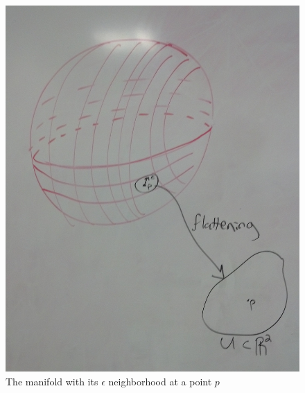 \begin{figure}[ht]
\centering
\includegraphics[width=\columnwidth]{manifolddiagram.jpg}
\caption{The manifold with its $\epsilon$ neighborhood at a point $p$}
\label{manifolddiagram}
\end{figure}
